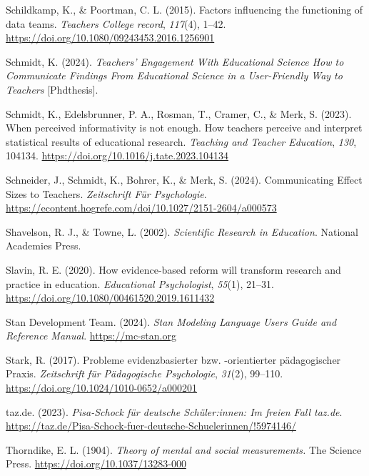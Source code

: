 \documentclass[
  jou,
  floatsintext,
  longtable,
  nolmodern,
  notxfonts,
  notimes,
  colorlinks=true,linkcolor=blue,citecolor=blue,urlcolor=blue]{apa7}
\newlength{\cslhangindent}
\newenvironment{CSLReferences}[2] %
 {\begin{list}{}{%
  \setlength{\itemindent}{0pt}
  \setlength{\leftmargin}{0pt}
  \setlength{\parsep}{0pt}
  \ifodd #1
   \setlength{\leftmargin}{\cslhangindent}
   \setlength{\itemindent}{-1\cslhangindent}
  \fi
  \setlength{\itemsep}{#2\baselineskip}}}
 {\end{list}}
\begin{document}
\begin{CSLReferences}{1}{0}
Schildkamp, K., \& Poortman, C. L. (2015). Factors influencing the
functioning of data teams. \emph{Teachers College record},
\emph{117}(4), 1--42.
\url{https://doi.org/10.1080/09243453.2016.1256901}

Schmidt, K. (2024). \emph{Teachers{'} Engagement With Educational
Science How to Communicate Findings From Educational Science in a
User-Friendly Way to Teachers} {[}Phdthesis{]}.

Schmidt, K., Edelsbrunner, P. A., Rosman, T., Cramer, C., \& Merk, S.
(2023). When perceived informativity is not enough. How teachers
perceive and interpret statistical results of educational research.
\emph{Teaching and Teacher Education}, \emph{130}, 104134.
\url{https://doi.org/10.1016/j.tate.2023.104134}

Schneider, J., Schmidt, K., Bohrer, K., \& Merk, S. (2024).
Communicating Effect Sizes to Teachers. \emph{Zeitschrift Für
Psychologie}.
\url{https://econtent.hogrefe.com/doi/10.1027/2151-2604/a000573}

Shavelson, R. J., \& Towne, L. (2002). \emph{Scientific Research in
Education}. National Academies Press.

Slavin, R. E. (2020). How evidence-based reform will transform research
and practice in education. \emph{Educational Psychologist},
\emph{55}(1), 21--31.
\url{https://doi.org/10.1080/00461520.2019.1611432}

Stan Development Team. (2024). \emph{Stan Modeling Language Users Guide
and Reference Manual}. \url{https://mc-stan.org}

Stark, R. (2017). Probleme evidenzbasierter bzw. -orientierter
pädagogischer Praxis. \emph{Zeitschrift für Pädagogische Psychologie},
\emph{31}(2), 99--110. \url{https://doi.org/10.1024/1010-0652/a000201}

taz.de. (2023). \emph{Pisa-Schock für deutsche Schü­le­r:in­nen: Im freien
Fall \textbar{} taz.de}.
\url{https://taz.de/Pisa-Schock-fuer-deutsche-Schuelerinnen/!5974146/}

Thorndike, E. L. (1904). \emph{Theory of mental and social
measurements.} The Science Press.
\url{https://doi.org/10.1037/13283-000}


\end{CSLReferences}
\end{document}
